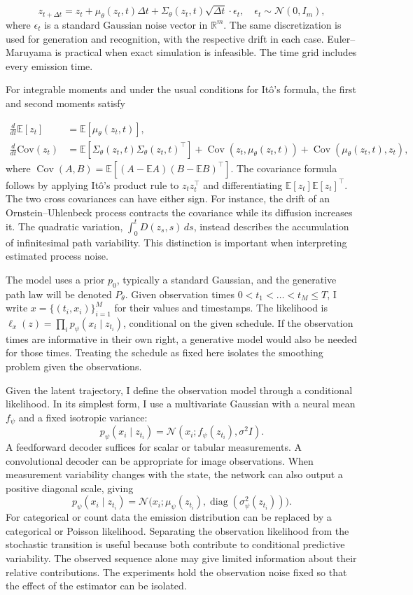 \documentclass[12pt]{article}
\newcommand{\E}{\mathbb{E}}
\newcommand{\Cov}{\operatorname{Cov}}
\newcommand{\N}{\mathcal{N}}
\DeclareMathOperator{\diag}{diag}
\begin{document}
\[
z_{t+\Delta t} = z_t + \mu_\theta(z_t, t) \Delta t + \Sigma_\theta(z_t, t) \sqrt{\Delta t} \cdot \epsilon_t, \quad \epsilon_t \sim \mathcal{N}(0, I_m),
\]
where $\epsilon_t$ is a standard Gaussian noise vector in $\mathbb{R}^m$. The same discretization is used for generation and recognition, with the respective drift in each case. Euler--Maruyama is practical when exact simulation is infeasible. The time grid includes every emission time.

For integrable moments and under the usual conditions for It\^o's formula, the first and second moments satisfy

\begin{align*}
\frac{d}{dt} \mathbb{E}[z_t] &= \mathbb{E}[\mu_\theta(z_t, t)], \\
\frac{d}{dt} \text{Cov}(z_t) &= \mathbb{E}[\Sigma_\theta(z_t, t) \Sigma_\theta(z_t, t)^\top] + \Cov(z_t,\mu_\theta(z_t,t))+\Cov(\mu_\theta(z_t,t),z_t),
\end{align*}
where \(\Cov(A,B)=\E[(A-\E A)(B-\E B)^\top]\). The covariance formula follows by applying It\^o's product rule to \(z_tz_t^\top\) and differentiating \(\E[z_t]\E[z_t]^\top\). The two cross covariances can have either sign. For instance, the drift of an Ornstein--Uhlenbeck process contracts the covariance while its diffusion increases it. The quadratic variation, \(\int_0^tD(z_s,s)\,ds\), instead describes the accumulation of infinitesimal path variability. This distinction is important when interpreting estimated process noise.

The model uses a prior \(p_0\), typically a standard Gaussian, and the generative path law will be denoted \(P_\theta\). Given observation times \(0<t_1<\dots<t_M\leq T\), I write \(x=\{(t_i,x_i)\}_{i=1}^M\) for their values and timestamps. The likelihood is \(\ell_x(z)=\prod_i p_\psi(x_i\mid z_{t_i})\), conditional on the given schedule. If the observation times are informative in their own right, a generative model would also be needed for those times. Treating the schedule as fixed here isolates the smoothing problem given the observations.

Given the latent trajectory, I define the observation model through a conditional likelihood. In its simplest form, I use a multivariate Gaussian with a neural mean \(f_\psi\) and a fixed isotropic variance:
\[
 p_\psi(x_i\mid z_{t_i})=\N(x_i; f_\psi(z_{t_i}),\sigma^2 I).
\]
A feedforward decoder suffices for scalar or tabular measurements. A convolutional decoder can be appropriate for image observations. When measurement variability changes with the state, the network can also output a positive diagonal scale, giving
\[
 p_\psi(x_i\mid z_{t_i})
 =\N\bigl(x_i;\mu_\psi(z_{t_i}),\diag(\sigma_\psi^2(z_{t_i}))\bigr).
\]
For categorical or count data the emission distribution can be replaced by a categorical or Poisson likelihood. Separating the observation likelihood from the stochastic transition is useful because both contribute to conditional predictive variability. The observed sequence alone may give limited information about their relative contributions. The experiments hold the observation noise fixed so that the effect of the estimator can be isolated.
\end{document}
